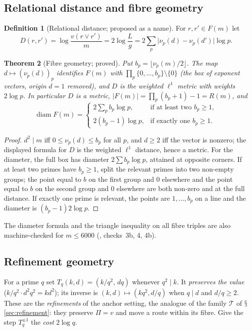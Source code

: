\documentclass[11pt,a4paper]{article}
\renewcommand{\S}{\ensuremath{\mathsection}}
\newcommand{\vj}{\mathbin{\vee}}
\theoremstyle{plain}
\newtheorem{theorem}{Theorem}[section]
\theoremstyle{definition}
\newtheorem{definition}[theorem]{Definition}
\begin{document}
\subsection{Relational distance and fibre geometry}\label{sec:nldist}
\begin{definition}[Relational distance; proposed as a name]\label{def:nldist}
For $r,r'\in F(m)$ let
\[ D(r,r')=\log\frac{v(r\vj r')}{m}=2\log\frac Lg=2\sum_p\bigl|\nu_p(d)-\nu_p(d')\bigr|\log p. \]
\end{definition}
\begin{theorem}[Fibre geometry; proved]\label{thm:nlgeom}
Put $b_p=\lfloor\nu_p(m)/2\rfloor$. The map $d\mapsto(\nu_p(d))_p$ identifies $F(m)$ with $\prod_p\{0,\dots,b_p\}\setminus\{0\}$ (the box of exponent vectors, origin $d=1$ removed), and $D$ is the weighted $\ell^1$ metric with weights $2\log p$. In particular $D$ is a metric, $|F(m)|=\prod_p(b_p+1)-1=R(m)$, and
\[ \operatorname{diam}F(m)=\begin{cases}2\sum_p b_p\log p,&\text{if at least two }b_p\ge1,\\ 2(b_p-1)\log p,&\text{if exactly one }b_p\ge1.\end{cases} \]
\end{theorem}
\begin{proof}
$d^2\mid m$ iff $0\le\nu_p(d)\le b_p$ for all $p$, and $d\ge2$ iff the vector is nonzero; the displayed formula for $D$ is the weighted $\ell^1$ distance, hence a metric. For the diameter, the full box has diameter $2\sum b_p\log p$, attained at opposite corners. If at least two primes have $b_p\ge1$, split the relevant primes into two non-empty groups; the point equal to $b$ on the first group and $0$ elsewhere and the point equal to $b$ on the second group and $0$ elsewhere are both non-zero and at the full distance. If exactly one prime is relevant, the points are $1,\dots,b_p$ on a line and the diameter is $(b_p-1)2\log p$.
\end{proof}
\noindent The diameter formula and the triangle inequality on all fibre triples are also machine-checked for $m\le6000$ (, checks~3b, 4, 4b).

\subsection{Refinement geometry}\label{sec:nlref}
For a prime $q$ set $T_q(k,d)=(k/q^2,\,dq)$ whenever $q^2\mid k$. It \emph{preserves the value} ($k/q^2\cdot d^2q^2=kd^2$); its inverse is $(k,d)\mapsto(kq^2,d/q)$ when $q\mid d$ and $d/q\ge2$. These are the \emph{refinements} of the anchor setting, the analogue of the family $\mathcal T$ of \S\ref{sec:refinement}: they preserve $\Pi=v$ and move a route within its fibre. Give the step $T_q^{\pm1}$ the \emph{cost} $2\log q$.
\end{document}
